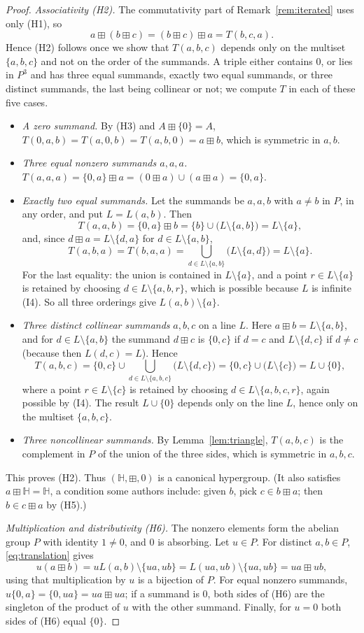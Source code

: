 \documentclass[12pt]{article}
\theoremstyle{plain}
\theoremstyle{definition}
\newcommand{\Hh}{\mathbb{H}}
\newcommand{\bp}{\boxplus}
\begin{document}
\begin{proof}
\emph{Associativity (H2).}  The commutativity part of
Remark~\ref{rem:iterated} uses only (H1), so
\[
 a\bp(b\bp c)=(b\bp c)\bp a=T(b,c,a).
\]
Hence (H2) follows once we show that $T(a,b,c)$ depends only on the
multiset $\{a,b,c\}$ and not on the order of the summands.  A triple
either contains $0$, or lies in $P^3$ and has three equal summands,
exactly two equal summands, or three distinct summands, the last being
collinear or not; we compute $T$ in each of these five cases.
\begin{itemize}
\item \emph{A zero summand.}  By (H3) and $A\bp\{0\}=A$,
$T(0,a,b)=T(a,0,b)=T(a,b,0)=a\bp b$, which is symmetric in $a,b$.
\item \emph{Three equal nonzero summands $a,a,a$.}
$T(a,a,a)=\{0,a\}\bp a=(0\bp a)\cup(a\bp a)=\{0,a\}$.
\item \emph{Exactly two equal summands.}  Let the summands be $a,a,b$
with $a\neq b$ in $P$, in any order, and put $L=L(a,b)$.  Then
\[
 T(a,a,b)=\{0,a\}\bp b=\{b\}\cup\bigl(L\setminus\{a,b\}\bigr)
 =L\setminus\{a\},
\]
and, since $d\bp a=L\setminus\{d,a\}$ for $d\in L\setminus\{a,b\}$,
\[
 T(a,b,a)=T(b,a,a)
 =\bigcup_{d\in L\setminus\{a,b\}}\bigl(L\setminus\{a,d\}\bigr)
 =L\setminus\{a\}.
\]
For the last equality: the union is contained in $L\setminus\{a\}$, and
a point $r\in L\setminus\{a\}$ is retained by choosing
$d\in L\setminus\{a,b,r\}$, which is possible because $L$ is infinite
(I4).  So all three orderings give $L(a,b)\setminus\{a\}$.
\item \emph{Three distinct collinear summands} $a,b,c$ on a line $L$.
Here $a\bp b=L\setminus\{a,b\}$, and for $d\in L\setminus\{a,b\}$ the
summand $d\bp c$ is $\{0,c\}$ if $d=c$ and $L\setminus\{d,c\}$ if
$d\neq c$ (because then $L(d,c)=L$).  Hence
\[
 T(a,b,c)=\{0,c\}\cup\bigcup_{d\in L\setminus\{a,b,c\}}
 \bigl(L\setminus\{d,c\}\bigr)=\{0,c\}\cup\bigl(L\setminus\{c\}\bigr)
 =L\cup\{0\},
\]
where a point $r\in L\setminus\{c\}$ is retained by choosing
$d\in L\setminus\{a,b,c,r\}$, again possible by (I4).  The result
$L\cup\{0\}$ depends only on the line $L$, hence only on the multiset
$\{a,b,c\}$.
\item \emph{Three noncollinear summands.}  By
Lemma~\ref{lem:triangle}, $T(a,b,c)$ is the complement in $P$ of the
union of the three sides, which is symmetric in $a,b,c$.
\end{itemize}
This proves (H2).  Thus $(\Hh,\bp,0)$ is a canonical hypergroup.  (It
also satisfies $a\bp\Hh=\Hh$, a condition some authors include: given
$b$, pick $c\in b\bp a$; then $b\in c\bp a$ by (H5).)

\emph{Multiplication and distributivity (H6).}  The nonzero elements
form the abelian group $P$ with identity $1\neq0$, and $0$ is
absorbing.  Let $u\in P$.  For distinct $a,b\in P$,
\eqref{eq:translation} gives
\[
 u(a\bp b)=uL(a,b)\setminus\{ua,ub\}=L(ua,ub)\setminus\{ua,ub\}
 =ua\bp ub,
\]
using that multiplication by $u$ is a bijection of $P$.  For equal
nonzero summands, $u\{0,a\}=\{0,ua\}=ua\bp ua$; if a summand is $0$,
both sides of (H6) are the singleton of the product of $u$ with the
other summand.  Finally, for $u=0$ both sides of (H6) equal $\{0\}$.
\end{proof}
\end{document}
